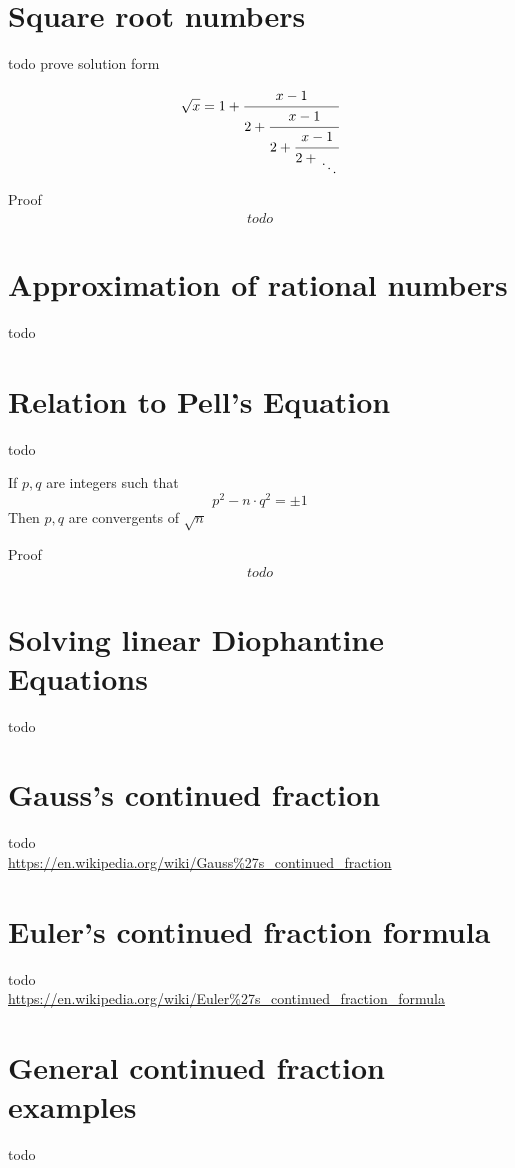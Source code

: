 \documentclass[a4paper]{article}
\begin{document}
\section{Square root numbers}
todo prove solution form 

\begin{theorem} 
$$
\sqrt{x} = 1 + \cfrac{x-1}{2 +\cfrac{x-1}{2 +\cfrac{x-1}{2 + \CFDots}}} 
$$

Proof
\begin{gather*}
todo
\end{gather*}
\end{theorem}

\section{Approximation of rational numbers}
todo

\section{Relation to Pell's Equation}
todo

\begin{theorem} 
If $p,q$ are integers such that
$$
p^2 - n \cdot q^2 =  \pm 1 
$$
Then $p,q$ are convergents of $\sqrt{n}$

Proof
\begin{gather*}
todo
\end{gather*}
\end{theorem}

\section{Solving linear Diophantine Equations}
todo 

\section{Gauss's continued fraction}
todo \\
\url{https://en.wikipedia.org/wiki/Gauss%27s_continued_fraction}

\section{Euler's continued fraction formula}
todo \\
\url{https://en.wikipedia.org/wiki/Euler%27s_continued_fraction_formula}


\section{General continued fraction examples}
todo
\end{document}
